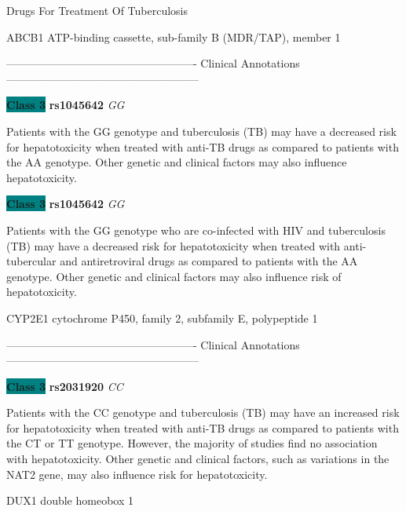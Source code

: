 \documentclass{resume} %
\begin{document}
\begin{rSection}{ Drugs For Treatment Of Tuberculosis }
\begin{rSubsection}{ ABCB1 }{ ATP-binding cassette, sub-family B (MDR/TAP), member 1 }{}{}
\item[]

\item[] ---------------------------------------------------- Clinical Annotations -----------------------------------------------------\newline
\item \textbf{\colorbox{teal} {Class 3}} \textbf{ rs1045642 } \textit{ GG }
\item[] Patients with the GG genotype and tuberculosis (TB) may have a decreased risk for hepatotoxicity when treated with anti-TB drugs as compared to patients with the AA genotype. Other genetic and clinical factors may also influence hepatotoxicity.\item \textbf{\colorbox{teal} {Class 3}} \textbf{ rs1045642 } \textit{ GG }
\item[] Patients with the GG genotype who are co-infected with HIV and tuberculosis (TB) may have a decreased risk for hepatotoxicity when treated with anti-tubercular and antiretroviral drugs as compared to patients with the AA genotype. Other genetic and clinical factors may also influence risk of hepatotoxicity.
\end{rSubsection}\begin{rSubsection}{ CYP2E1 }{ cytochrome P450, family 2, subfamily E, polypeptide 1 }{}{}
\item[]

\item[] ---------------------------------------------------- Clinical Annotations -----------------------------------------------------\newline
\item \textbf{\colorbox{teal} {Class 3}} \textbf{ rs2031920 } \textit{ CC }
\item[] Patients with the CC genotype and tuberculosis (TB) may have an increased risk for hepatotoxicity when treated with anti-TB drugs as compared to patients with the CT or TT genotype. However, the majority of studies find no association with hepatotoxicity. Other genetic and clinical factors, such as variations in the NAT2 gene, may also influence risk for hepatotoxicity.
\end{rSubsection}\begin{rSubsection}{ DUX1 }{ double homeobox 1 }{}{}
\item[]


\end{rSubsection}
\end{rSection}
\end{document}
